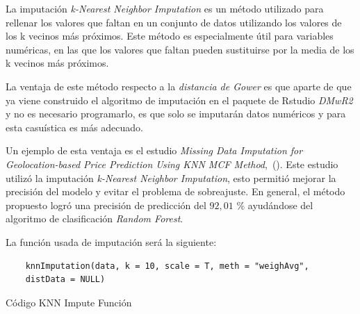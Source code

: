 La imputación \textit{k-Nearest Neighbor Imputation} es un método utilizado para rellenar los valores que faltan en un conjunto de datos utilizando los valores de los k vecinos más próximos. Este método es especialmente útil para variables numéricas, en las que los valores que faltan pueden sustituirse por la media de los k vecinos más próximos.

La ventaja de este método respecto a la \textit{distancia de Gower} es que aparte de que ya viene construido el algoritmo de imputación en el paquete de Rstudio \textit{DMwR2} y no es necesario programarlo, es que solo se imputarán datos numéricos y para esta casuística es más adecuado.

Un ejemplo de esta ventaja es el estudio \textit{Missing Data Imputation for Geolocation-based Price Prediction Using KNN MCF Method},~(\cite{Sanjar2020}). Este estudio utilizó la imputación \textit{k-Nearest Neighbor Imputation}, esto permitió mejorar la precisión del modelo y evitar el problema de sobreajuste. En general, el método propuesto logró una precisión de predicción del $92,01$ \% ayudándose del algoritmo de clasificación \textit{Random Forest}. 

La función usada de imputación será la siguiente:

\begin{code}[H]
\begin{lstlisting}
    knnImputation(data, k = 10, scale = T, meth = "weighAvg",
    distData = NULL)
\end{lstlisting}
\caption{Código KNN Impute Función}
\label{cod:snipet-knn-impute}
\end{code}




 






